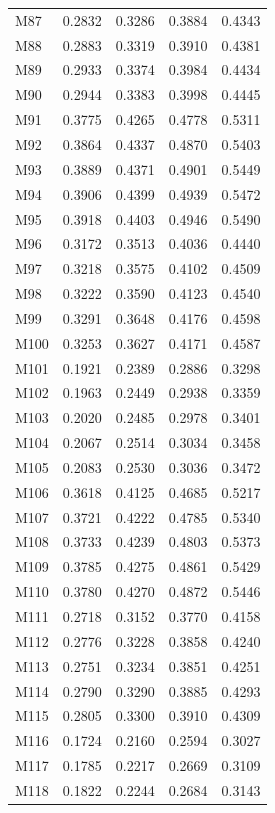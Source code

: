\begin{longtable}{lrrrr}
M87 & 0.2832 & 0.3286 & 0.3884 & 0.4343 \\
M88 & 0.2883 & 0.3319 & 0.3910 & 0.4381 \\
M89 & 0.2933 & 0.3374 & 0.3984 & 0.4434 \\
M90 & 0.2944 & 0.3383 & 0.3998 & 0.4445 \\
M91 & 0.3775 & 0.4265 & 0.4778 & 0.5311 \\
M92 & 0.3864 & 0.4337 & 0.4870 & 0.5403 \\
M93 & 0.3889 & 0.4371 & 0.4901 & 0.5449 \\
M94 & 0.3906 & 0.4399 & 0.4939 & 0.5472 \\
M95 & 0.3918 & 0.4403 & 0.4946 & 0.5490 \\
M96 & 0.3172 & 0.3513 & 0.4036 & 0.4440 \\
M97 & 0.3218 & 0.3575 & 0.4102 & 0.4509 \\
M98 & 0.3222 & 0.3590 & 0.4123 & 0.4540 \\
M99 & 0.3291 & 0.3648 & 0.4176 & 0.4598 \\
M100 & 0.3253 & 0.3627 & 0.4171 & 0.4587 \\
M101 & 0.1921 & 0.2389 & 0.2886 & 0.3298 \\
M102 & 0.1963 & 0.2449 & 0.2938 & 0.3359 \\
M103 & 0.2020 & 0.2485 & 0.2978 & 0.3401 \\
M104 & 0.2067 & 0.2514 & 0.3034 & 0.3458 \\
M105 & 0.2083 & 0.2530 & 0.3036 & 0.3472 \\
M106 & 0.3618 & 0.4125 & 0.4685 & 0.5217 \\
M107 & 0.3721 & 0.4222 & 0.4785 & 0.5340 \\
M108 & 0.3733 & 0.4239 & 0.4803 & 0.5373 \\
M109 & 0.3785 & 0.4275 & 0.4861 & 0.5429 \\
M110 & 0.3780 & 0.4270 & 0.4872 & 0.5446 \\
M111 & 0.2718 & 0.3152 & 0.3770 & 0.4158 \\
M112 & 0.2776 & 0.3228 & 0.3858 & 0.4240 \\
M113 & 0.2751 & 0.3234 & 0.3851 & 0.4251 \\
M114 & 0.2790 & 0.3290 & 0.3885 & 0.4293 \\
M115 & 0.2805 & 0.3300 & 0.3910 & 0.4309 \\
M116 & 0.1724 & 0.2160 & 0.2594 & 0.3027 \\
M117 & 0.1785 & 0.2217 & 0.2669 & 0.3109 \\
M118 & 0.1822 & 0.2244 & 0.2684 & 0.3143 \\

\end{longtable}
